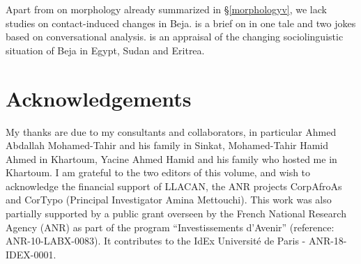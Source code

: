 \documentclass[output=paper]{langsci/langscibook}
\begin{document}
Apart from \citet{Vanhove2012} on  morphology already summarized in §\ref{morphologyv}, we lack studies on contact-induced changes in Beja. \citet{Vanhove2003} is a brief  on  in one tale and two jokes based on conversational analysis. \citet{Wedekind2012} is an appraisal of the changing sociolinguistic situation of Beja in Egypt, Sudan and Eritrea.

\section*{Acknowledgements}

My thanks are due to my  consultants and collaborators, in particular Ahmed Abdallah Mohamed-Tahir and his family in Sinkat, Mohamed-Tahir Hamid Ahmed in Khartoum, Yacine Ahmed Hamid and his family who hosted me in Khartoum. I am grateful to the two editors of this volume, and wish to acknowledge the financial support of LLACAN, the ANR projects CorpAfroAs and CorTypo (Principal Investigator Amina Mettouchi). This work was also partially supported by a public grant overseen by the French National Research Agency (ANR) as part of the program “Investissements d'Avenir” (reference: ANR-10-LABX-0083). It contributes to the IdEx Université de Paris - ANR-18-IDEX-0001.
\end{document}
